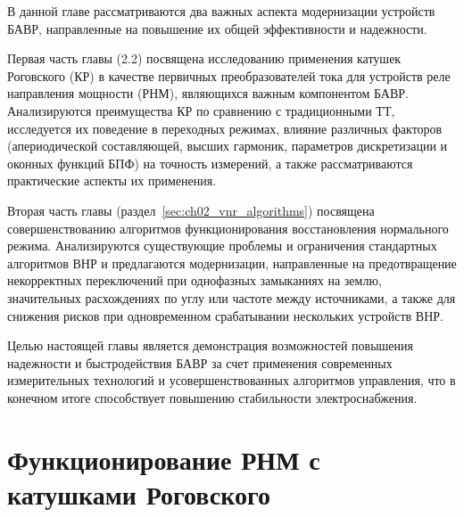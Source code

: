В данной главе рассматриваются два важных аспекта модернизации устройств БАВР,
направленные на повышение их общей эффективности и надежности.\par\vspace{0.2cm}

Первая часть главы (2.2) посвящена исследованию применения катушек Роговского (КР) в
качестве первичных преобразователей тока для устройств реле направления мощности (РНМ),
являющихся важным компонентом БАВР. Анализируются преимущества КР по сравнению с
традиционными ТТ, исследуется их поведение в переходных режимах, влияние различных
факторов (апериодической составляющей, высших гармоник, параметров дискретизации и
оконных функций БПФ) на точность измерений, а также рассматриваются практические аспекты
их применения.\par\vspace{0.2cm}

Вторая часть главы (раздел~\ref{sec:ch02_vnr_algorithms}) посвящена совершенствованию
алгоритмов функционирования восстановления нормального режима. Анализируются
существующие проблемы и ограничения стандартных алгоритмов ВНР и предлагаются
модернизации, направленные на предотвращение некорректных переключений при однофазных
замыканиях на землю, значительных расхождениях по углу или частоте между источниками, а
также для снижения рисков при одновременном срабатывании нескольких устройств
ВНР.\par\vspace{0.2cm}

Целью настоящей главы является демонстрация возможностей повышения надежности и
быстродействия БАВР за счет применения современных измерительных технологий и
усовершенствованных алгоритмов управления, что в конечном итоге способствует повышению
стабильности электроснабжения.\par\vspace{0.2cm}


\section{Функционирование РНМ с катушками Роговского}\label{sec:ch2_rnm_rogowski}

